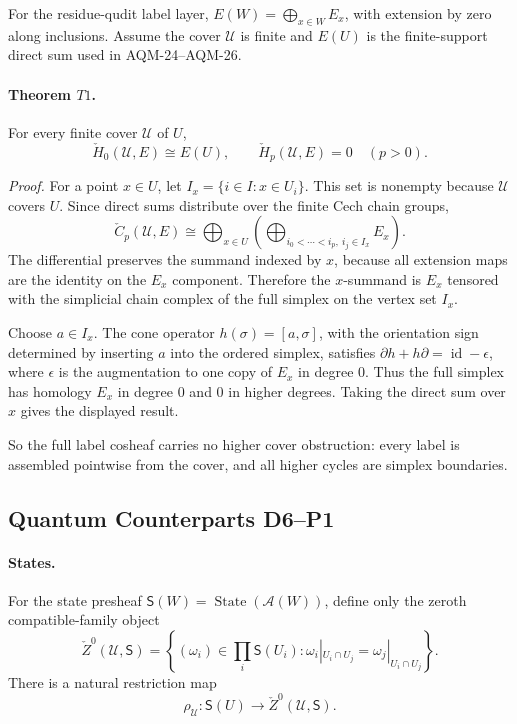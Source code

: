 For the residue-qudit label layer, \(E(W)=\bigoplus_{x\in W}E_x\), with
extension by zero along inclusions.  Assume the cover \(\mathcal U\) is finite
and \(E(U)\) is the finite-support direct sum used in AQM-24--AQM-26.

\paragraph{Theorem \(T1\).}
For every finite cover \(\mathcal U\) of \(U\),
\[
  \check H_0(\mathcal U,E)\cong E(U),
  \qquad
  \check H_p(\mathcal U,E)=0\quad(p>0).
\]

\emph{Proof.}
For a point \(x\in U\), let \(I_x=\{i\in I:x\in U_i\}\).  This set is
nonempty because \(\mathcal U\) covers \(U\).  Since direct sums distribute
over the finite Cech chain groups,
\[
  \check C_p(\mathcal U,E)
  \cong
  \bigoplus_{x\in U}
  \left(
    \bigoplus_{i_0<\cdots<i_p,\ i_j\in I_x}E_x
  \right).
\]
The differential preserves the summand indexed by \(x\), because all
extension maps are the identity on the \(E_x\) component.  Therefore the
\(x\)-summand is \(E_x\) tensored with the simplicial chain complex of the
full simplex on the vertex set \(I_x\).

Choose \(a\in I_x\).  The cone operator \(h(\sigma)=[a,\sigma]\), with the
orientation sign determined by inserting \(a\) into the ordered simplex,
satisfies \(\partial h+h\partial=\operatorname{id}-\epsilon\), where
\(\epsilon\) is the augmentation to one copy of \(E_x\) in degree \(0\).  Thus
the full simplex has homology \(E_x\) in degree \(0\) and \(0\) in higher
degrees.  Taking the direct sum over \(x\) gives the displayed result.

So the full label cosheaf carries no higher cover obstruction: every label is
assembled pointwise from the cover, and all higher cycles are simplex
boundaries.

\subsection{Quantum Counterparts D6--P1}

\paragraph{States.}
For the state presheaf \(\mathsf S(W)=\operatorname{State}(\mathcal A(W))\),
define only the zeroth compatible-family object
\[
  \check Z^0(\mathcal U,\mathsf S)=
  \left\{(\omega_i)\in\prod_i\mathsf S(U_i):
  \omega_i|_{U_i\cap U_j}=\omega_j|_{U_i\cap U_j}\right\}.
\]
There is a natural restriction map
\[
  \rho_{\mathcal U}:\mathsf S(U)\longrightarrow
  \check Z^0(\mathcal U,\mathsf S).
\]


